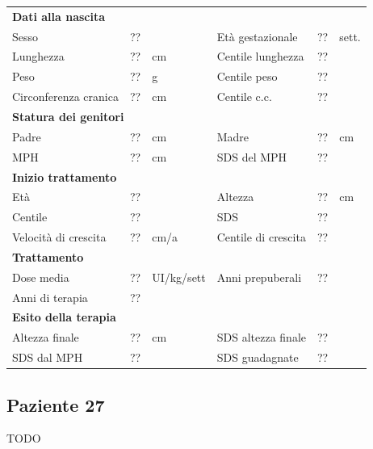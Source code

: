 \begin{table}[!h]
\begin{tabular}{lrllrl}
\toprule
\multicolumn{6}{l}{\textbf{Dati alla nascita}}\\
Sesso 		& \multicolumn{2}{l}{??} 	& Età gestazionale 		& ?? 		& sett.\\
Lunghezza 	& ?? 		& cm 				& Centile lunghezza		& ?? 		\\
Peso 		& ?? 		& g					& Centile peso			& ?? 		\\
Circonferenza cranica	& ?? 		& cm 	& Centile c.c.			& ?? \\
\midrule
\multicolumn{6}{l}{\textbf{Statura dei genitori}}\\
Padre 		& ?? & cm 	& Madre 				& ?? & cm \\
MPH 		& ?? & cm 	& SDS del MPH 			& ??\\
\midrule
\multicolumn{6}{l}{\textbf{Inizio trattamento}} \\
Età	& ?? & 		& Altezza 				& ?? & cm  \\
Centile & ?? 	 &		& SDS		& ?? \\
Velocità di crescita & ?? & cm/a	& Centile di crescita & ??\\
\midrule
\multicolumn{6}{l}{\textbf{Trattamento}} \\
Dose media		& ?? & UI/kg/sett & Anni prepuberali & ??\\
Anni di terapia & ??\\
\midrule
\multicolumn{6}{l}{\textbf{Esito della terapia}} \\
Altezza finale			& ?? & cm 	& SDS altezza finale		& ??\\
SDS dal MPH				& ?? &		& SDS guadagnate 			& ??\\
\bottomrule
\end{tabular}
\end{table}
\clearpage


\subsection*{Paziente 27}

TODO

